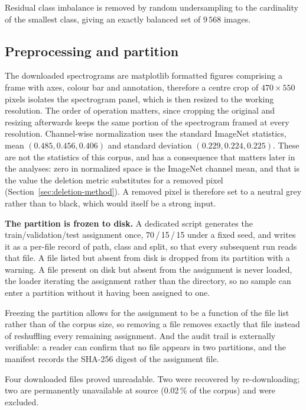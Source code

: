 Residual class imbalance is removed by random undersampling to the cardinality of
the smallest class, giving an exactly balanced set of $9\,568$ images.
 
\subsection{Preprocessing and partition}
 
The downloaded spectrograms are matplotlib formatted figures comprising a frame with axes,
colour bar and annotation, therefore a centre crop of $470 \times 550$ pixels isolates the
spectrogram panel, which is then resized to the working resolution. The order of operation
matters, since cropping the original and resizing afterwards keeps the same
portion of the spectrogram framed at every resolution. Channel-wise
normalization uses the standard ImageNet statistics, mean
$(0.485, 0.456, 0.406)$ and standard deviation $(0.229, 0.224, 0.225)$. These
are not the statistics of this corpus, and has a consequence that
matters later in the analyses: zero in normalized space is the ImageNet channel mean, and that
is the value the deletion metric substitutes for a removed pixel
(Section~\ref{sec:deletion-method}). A removed pixel is therefore set to a
neutral grey rather than to black, which would itself be a strong input.
 
\textbf{The partition is frozen to disk.} A dedicated script generates the
train/validation/test assignment once, 70\,/\,15\,/\,15 under a fixed seed, and
writes it as a per-file record of path, class and split, so that every subsequent run
reads that file. A file listed but absent from disk is dropped from its partition
with a warning. A file present on disk but absent from the assignment is never
loaded, the loader iterating the assignment rather than the directory, so
no sample can enter a partition without it having been assigned to one.
 
Freezing the partition allows for the assignment to be a function of the file list rather than
of the corpus size, so removing a file removes exactly that file instead of
reshuffling every remaining assignment. And the audit trail is externally
verifiable: a reader can confirm that no file appears in two partitions, and the
manifest records the SHA-256 digest of the assignment file.
 
Four downloaded files proved unreadable. Two were recovered by re-downloading;
two are permanently unavailable at source (0.02\,\% of the corpus) and were
excluded.

